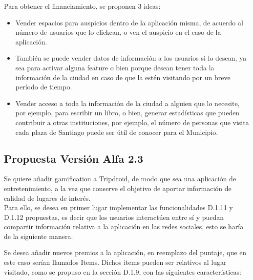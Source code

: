 \documentclass[10pt,letterpaper]{article}
\begin{document}
\begin{itemize}
Para obtener el financiamiento, se proponen 3 ideas:\\

\begin{itemize}
 \item Vender espacios para auspicios dentro de la aplicación misma, de acuerdo al número de usuarios que lo clickean, o ven el auspicio en el caso de la aplicación.

 \item También se puede vender datos de información a los usuarios si lo desean, ya sea para activar alguna feature o bien porque desean tener toda la información de la ciudad en caso de que la estén visitando por un breve período de tiempo.

 \item Vender acceso a toda la información de la ciudad a alguien que lo necesite, por ejemplo, para escribir un libro, o bien, generar estadísticas que pueden contribuir a otras instituciones, por ejemplo, el número de personas que visita cada plaza de Santiago puede ser útil de conocer para el Municipio.
\end{itemize}
\end{itemize}

\subsection{Propuesta Versión Alfa 2.3}

Se quiere añadir gamification a Tripdroid, de modo que sea una aplicación de entretenimiento, a la vez que conserve el objetivo de aportar información de calidad de lugares de interés.\\

Para ello, se desea en primer lugar implementar las funcionalidades D.1.11 y D.1.12 propuestas, es decir que los usuarios interactúen entre sí y puedan compartir información relativa a la aplicación en las redes sociales, esto se haría de la siguiente manera.

Se desea añadir nuevos premios a la aplicación, en reemplazo del puntaje, que en este caso serían llamados Items. Dichos items pueden ser relativos al lugar visitado, como se propuso en la sección D.1.9, con las siguientes características:\\
\end{document}
